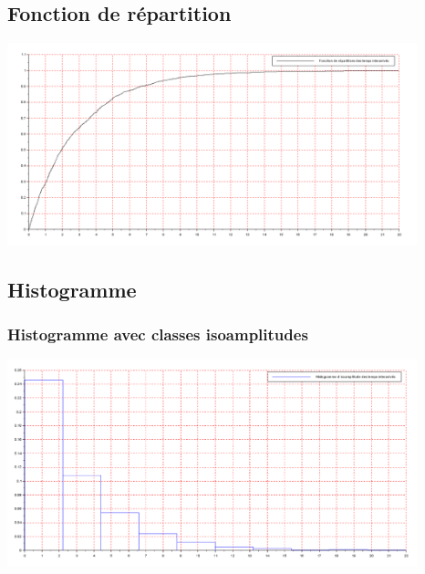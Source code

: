 \documentclass{article}
\begin{document}
\subsection{Fonction de répartition}
\begin{center}
\includegraphics[width=450px]{img/repart.png}
\end{center}
\paragraph{}

\subsection{Histogramme}

\subsubsection{Histogramme avec classes isoamplitudes}
\begin{center}
\includegraphics[width=450px]{img/H_isoa.png}
\end{center}
\paragraph{}
\end{document}
